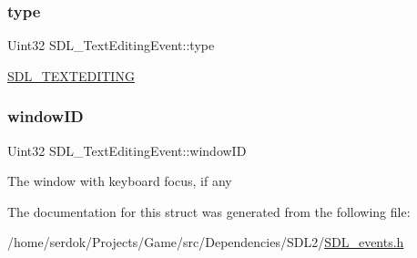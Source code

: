 \subsubsection{\texorpdfstring{type}{type}}
{\footnotesize\ttfamily Uint32 S\+D\+L\+\_\+\+Text\+Editing\+Event\+::type}

\hyperlink{SDL__events_8h_a3b589e89be6b35c02e0dd34a55f3fccaa1b80c465df69c0b6d06f026ce7a230e3}{S\+D\+L\+\_\+\+T\+E\+X\+T\+E\+D\+I\+T\+I\+NG} \mbox{\label{structSDL__TextEditingEvent_a23b3e414cf7a7ccc547b7595ca930049}} 
\subsubsection{\texorpdfstring{window\+ID}{windowID}}
{\footnotesize\ttfamily Uint32 S\+D\+L\+\_\+\+Text\+Editing\+Event\+::window\+ID}

The window with keyboard focus, if any 

The documentation for this struct was generated from the following file\+:\begin{DoxyCompactItemize}
\item 
/home/serdok/\+Projects/\+Game/src/\+Dependencies/\+S\+D\+L2/\hyperlink{SDL__events_8h}{S\+D\+L\+\_\+events.\+h}\end{DoxyCompactItemize}
